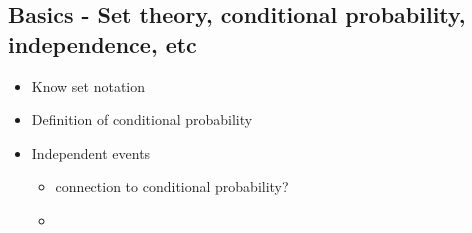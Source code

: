 \documentclass[12pt]{article}
\begin{document}
\subsection{Basics - Set theory, conditional probability, independence, etc}
\begin{itemize}
    \item Know set notation
    \item Definition of conditional probability
    \item Independent events
    \begin{itemize}
        \item connection to conditional probability?
        \item 
    \end{itemize}
\end{itemize}
\end{document}
